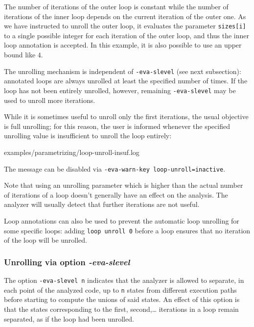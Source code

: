 \documentclass{frama-c-book}
\begin{document}

The number of iterations of the outer loop is constant while the number of
iterations of the inner loop depends on the current iteration of the outer
one. As we have instructed \Eva{} to unroll the outer loop, it evaluates the
parameter \lstinline|sizes[i]| to a single possible integer for each iteration
of the outer loop, and thus the inner loop annotation is accepted. In this
example, it is also possible to use an upper bound like $4$.

The unrolling mechanism is independent of \lstinline|-eva-slevel|
(see next subsection): annotated loops are always unrolled at least the specified
number of times. If the loop has not been entirely unrolled, however,
remaining \lstinline|-eva-slevel| may be used to unroll more iterations.

While it is sometimes useful to unroll only the first iterations, the usual
objective is full unrolling; for this reason, the user is informed whenever
the specified unrolling value is insufficient to unroll the loop entirely:


  {examples/parametrizing/loop-unroll-insuf.log}

The message can be disabled via \lstinline|-eva-warn-key loop-unroll=inactive|.

Note that using an unrolling parameter which is higher than the actual number
of iterations of a loop doesn't generally have an effect on the analysis.
The analyzer will usually detect that further iterations are not useful.

Loop annotations can also be used to prevent the automatic loop unrolling
for some specific loops: adding \lstinline|loop unroll 0| before a loop
ensures that no iteration of the loop will be unrolled.

\subsubsection{Unrolling via option {\em -eva-slevel}}
\label{slevel}

The option \lstinline|-eva-slevel n| indicates that the analyzer is allowed
to separate, in each point of the analyzed code,
up to \lstinline|n| states from different execution paths before starting
to compute the unions of said states. An effect of this option
is that the states corresponding to the first, second,\ldots
iterations in a loop remain separated, as if the loop had been unrolled.
\end{document}
